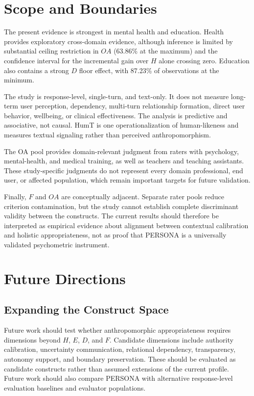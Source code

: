 \documentclass[manuscript,review,anonymous]{acmart}
\begin{document}
\section{Scope and Boundaries}

The present evidence is strongest in mental health and education. Health provides exploratory cross-domain evidence, although inference is limited by substantial ceiling restriction in $OA$ (63.86\% at the maximum) and the confidence interval for the incremental gain over $H$ alone crossing zero. Education also contains a strong $D$ floor effect, with 87.23\% of observations at the minimum.

The study is response-level, single-turn, and text-only. It does not measure long-term user perception, dependency, multi-turn relationship formation, direct user behavior, wellbeing, or clinical effectiveness. The analysis is predictive and associative, not causal. HumT is one operationalization of human-likeness and measures textual signaling rather than perceived anthropomorphism.

The OA pool provides domain-relevant judgment from raters with psychology, mental-health, and medical training, as well as teachers and teaching assistants. These study-specific judgments do not represent every domain professional, end user, or affected population, which remain important targets for future validation.

Finally, $F$ and $OA$ are conceptually adjacent. Separate rater pools reduce criterion contamination, but the study cannot establish complete discriminant validity between the constructs. The current results should therefore be interpreted as empirical evidence about alignment between contextual calibration and holistic appropriateness, not as proof that PERSONA is a universally validated psychometric instrument.

\section{Future Directions}

\subsection{Expanding the Construct Space}

Future work should test whether anthropomorphic appropriateness requires dimensions beyond $H$, $E$, $D$, and $F$. Candidate dimensions include authority calibration, uncertainty communication, relational dependency, transparency, autonomy support, and boundary preservation. These should be evaluated as candidate constructs rather than assumed extensions of the current profile. Future work should also compare PERSONA with alternative response-level evaluation baselines and evaluator populations.
\end{document}
